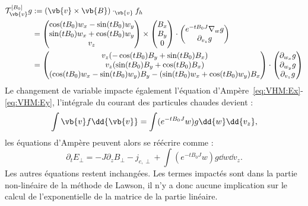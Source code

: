 \begin{equation}
  \begin{aligned}
    \mathcal{T}_{\vb{v}}^{[B_0]}g &:= (\vb{v}\times\vb{B})\cdot_{\vb{v}}f_h \\
                                  & = \begin{pmatrix}
                                    \cos(tB_0)w_x - \sin(tB_0)w_y \\
                                    \sin(tB_0)w_x + \cos(tB_0)w_y \\
                                    v_z
                                  \end{pmatrix}
                                  \times
                                  \begin{pmatrix}
                                     B_x \\ B_y \\ 0
                                  \end{pmatrix} 
                                  \cdot
                                  \begin{pmatrix}
                                    e^{-tB_0J}\nabla_w g \\
                                    \partial_{v_z}g
                                  \end{pmatrix} \\
                                  & = \begin{pmatrix}
                                    v_z(-\cos(tB_0)B_y + \sin(tB_0)B_x) \\
                                    v_z(\sin(tB_0)B_y + \cos(tB_0)B_x) \\
                                    (\cos(tB_0)w_x-\sin(tB_0)w_y)B_y - (\sin(tB_0)w_x+\cos(tB_0)w_y)B_x
                                  \end{pmatrix}
                                  \cdot
                                  \begin{pmatrix}
                                    \partial_{w_x}g \\
                                    \partial_{w_y}g \\
                                    \partial_{v_z}g
                                  \end{pmatrix}
  \end{aligned}
\end{equation}
Le changement de variable impacte également l'équation d'Ampère~\eqref{eq:VHM:Ex}-\eqref{eq:VHM:Ey}, l'intégrale du courant des particules chaudes devient :
$$
  \int\vb{v}f\dd{\vb{v}} = \int(e^{-tB_0J}w)g\dd{w}\dd{v_z},
$$
les équations d'Ampère peuvent alors se réécrire comme :
\begin{equation}
  \partial_t E_\perp = -J\partial_z B_\perp - j_{c,\perp} + \int (e^{-tB_0J}w)g\dd{w}\dd{v_z}.
\end{equation}
Les autres équations restent inchangées. Les termes impactés sont dans la partie non-linéaire de la méthode de Lawson, il n'y a donc aucune implication sur le calcul de l'exponentielle de la matrice de la partie linéaire.

